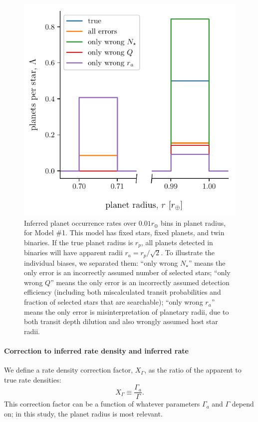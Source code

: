 \begin{figure}[!tb]
    \begin{center}
        \includegraphics[width=.6\textwidth]{figures/errcases_rate_density_vs_radius_model_1_brokenx.pdf}
    \end{center}
    \vspace{-0.5cm}
    \caption{
        Inferred planet occurrence rates over $0.01r_\oplus$ bins in planet 
        radius,
        for Model \#1.
        This model has fixed stars, fixed planets, and twin binaries.
        If the true planet radius is $r_p$, all planets 
        detected in binaries will have apparent radii $r_a = r_p/\sqrt{2}$.
        To illustrate the individual biases, we 
        separated them:
        ``only wrong $N_\star$'' means the only error is an incorrectly 
        assumed 
        number of selected stars;
        ``only wrong $Q$'' means the only error is an incorrectly assumed 
        detection efficiency (including both miscalculated transit 
        probabilities 
        and 
        fraction of selected stars that are searchable);
        ``only wrong $r_a$'' means the only error is misinterpretation of 
        planetary radii, due to both transit depth dilution and also wrongly 
        assumed host star radii.
    }
    \label{fig:errcases_model_1}
\end{figure}


\paragraph{Correction to inferred rate density and inferred rate}

We define a rate density correction factor, $X_\Gamma$, as the ratio of the 
apparent to true rate densities:
\begin{equation}
X_\Gamma \equiv \frac{\Gamma_a}{\Gamma}.
\end{equation}
This correction factor can be a function of whatever parameters $\Gamma_a$ and 
$\Gamma$ depend on; in this study, the planet radius is most relevant.

